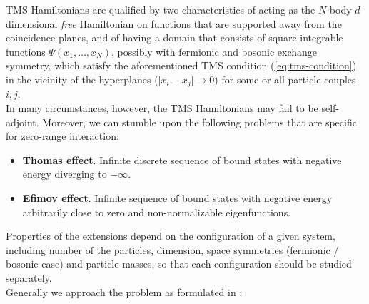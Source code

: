 \documentclass[11pt, a4paper, german]{article}
\theoremstyle{plain}
\theoremstyle{definition}
\theoremstyle{remark}
\numberwithin{equation}{section}
\numberwithin{theorem}{section}
\begin{document}
TMS Hamiltonians are qualified by two characteristics of acting as the $N$-body $d$-dimensional \textit{free} Hamiltonian on functions that are supported away from the coincidence planes, and of having a domain that consists of square-integrable functions $\Psi(x_1, \dots, x_N)$, possibly with fermionic and bosonic exchange symmetry, which satisfy the aforementioned TMS condition (\ref{eq:tms-condition}) in the vicinity of the hyperplanes ($\vert x_i - x_j\vert \rightarrow 0$) for some or all particle couples $i, j$.\\

In many circumstances, however, the TMS Hamiltonians may fail to be self-adjoint. Moreover, we can stumble upon the following problems that are specific for zero-range interaction:

\begin{itemize}
\item \textbf{Thomas effect}. Infinite discrete sequence of bound states with negative energy diverging to $-\infty$.
\item \textbf{Efimov effect}. Infinite sequence of bound states with negative energy arbitrarily close to zero and non-normalizable eigenfunctions.
\end{itemize}

Properties of the extensions depend on the configuration of a given system, including number of the particles, dimension, space symmetries (fermionic / bosonic case) and particle masses, so that each configuration should be studied separately.\\

Generally we approach the problem as formulated in \cite{A2}:
\end{document}

